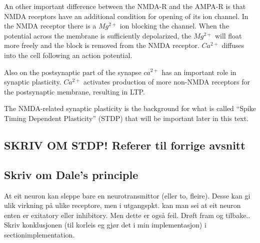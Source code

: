 An other important difference between the NMDA-R and the AMPA-R is that NMDA receptors have an additional condition for opening of its ion channel. 
In the NMDA receptor there is a $Mg^{2+}$ ion blocking the channel. 
When the potential across the membrane is sufficiently depolarized, the $Mg^{2+}$ will float more freely and the block is removed from the NMDA receptor.
$Ca^{2+}$ diffuses into the cell following an action potential\cite{PrinciplesOfNeuralScience4edKAP12}.

Also on the postsynaptic part of the synapse $ca^{2+}$ has an important role in synaptic plasticity. 
$Ca^{2+}$ activates production of more non-NMDA receptors for the postsynaptic membrane, resulting in LTP\cite{AMPARtrafficingArtikkel}.%

The NMDA-related synaptic plasticity is the background for what is called ``Spike Timing Dependent Plasticity'' (STDP) that will be important later in this text.

\subsection{SKRIV OM STDP! Referer til forrige avsnitt}
\label{forklaringBakSTDP} %

\subsection{Skriv om Dale's  principle}
At eit neuron kan sleppe bare en neurotransmittor (eller to, fleire). Desse kan gi ulik virkning på ulike receptore, men i utgangspkt. kan man sei at eit neuron enten er exitatory eller inhibitory. 
Men dette er også feil. Drøft fram og tilbake.. Skriv konklusjonen (til korleis eg gjør det i min implementasjon) i section{implementation}.



